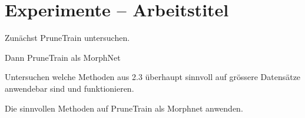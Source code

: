 \chapter{Experimente -- Arbeitstitel}\label{sec:experimente}

Zunächst PruneTrain untersuchen. 

Dann PruneTrain als MorphNet

Untersuchen welche Methoden aus 2.3 überhaupt sinnvoll auf grössere Datensätze anwendebar sind und funktionieren.

Die sinnvollen Methoden auf PruneTrain als Morphnet anwenden.






